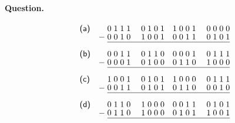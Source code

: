 \paragraph{Question.}
\[
\renewcommand\arraystretch{0.85}
\begin{array}{lr@{\;}c@{\;}c@{\;}c@{\;}c@{\;}cc@{\;}c@{\;}c@{\;}cc@{}c@{\;}c@{\;}c@{\;}c@{\;}cc@{\;}c@{\;}c@{\;}c@{}}
\textsf{(a)} &   & 0&1&1&1 & & 0&1&0&1 & & 1&0&0&1 & & 0&0&0&0\\
             & - & 0&0&1&0 & & 1&0&0&1 & & 0&0&1&1 & & 0&1&0&1\\
\cline{3-21}\\
\textsf{(b)} &   & 0&0&1&1 & & 0&1&1&0 & & 0&0&0&1 & & 0&1&1&1\\
             & - & 0&0&0&1 & & 0&1&0&0 & & 0&1&1&0 & & 1&0&0&0\\
\cline{3-21}\\
\textsf{(c)} &   & 1&0&0&1 & & 0&1&0&1 & & 1&0&0&0 & & 0&1&1&1\\
             & - & 0&0&1&1 & & 0&1&0&1 & & 0&1&1&0 & & 0&0&1&0\\
\cline{3-21}\\
\textsf{(d)} &   & 0&1&1&0 & & 1&0&0&0 & & 0&0&1&1 & & 0&1&0&1\\
             & - & 0&1&1&0 & & 1&0&0&0 & & 0&1&0&1 & & 1&0&0&1\\
\cline{3-21}
\end{array}
\]
